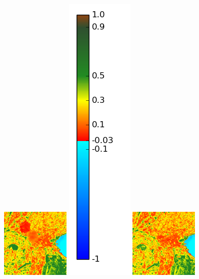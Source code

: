 \documentclass{book}
\begin{document}
\begin{figure}[H]
{\includegraphics[scale=0.7]{images/Annecy/06_ndvi.png}
\includegraphics[scale=0.2]{images/colormap.png}
\includegraphics[scale=0.7]{images/Annecy/07_ndvi.png}
}
\end{figure}
\end{document}
